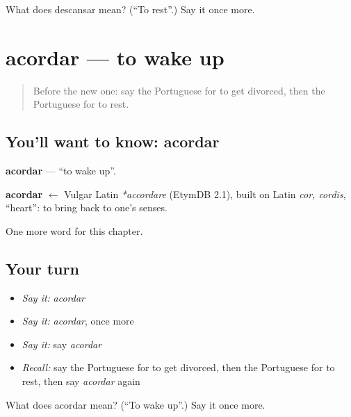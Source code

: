 \begin{tcolorbox}[breakable,colback=teal!4,colframe=teal!35!black,title={Before you move on}]
What does descansar mean? (\textquotedblleft{}To rest\textquotedblright{}.) Say it once more.
\end{tcolorbox}
\section[acordar]{acordar — to wake up}

\label{lesson:PT-C203-acordar}



\begin{quote}
Before the new one: say the Portuguese for to get divorced, then the Portuguese for to rest.
\end{quote}

\subsection*{You'll want to know: acordar}
\textbf{acordar} — \textquotedblleft{}to wake up\textquotedblright{}.

\begin{cousinweb}
\textbf{acordar} $\leftarrow$ Vulgar Latin \emph{*accordare} (EtymDB 2.1), built on Latin \emph{cor, cordis}, \textquotedblleft{}heart\textquotedblright{}: to bring back to one's senses.
\end{cousinweb}

\begin{grammarlens}[title={What you've built}]
One more word for this chapter.
\end{grammarlens}

\subsection*{Your turn}
\begin{itemize}
\raggedright
  \item \emph{Say it:} \emph{acordar}
  \item \emph{Say it:} \emph{acordar}, once more
  \item \emph{Say it:} say \emph{acordar}
  \item \emph{Recall:} say the Portuguese for to get divorced, then the Portuguese for to rest, then say \emph{acordar} again
\end{itemize}

\begin{tcolorbox}[breakable,colback=teal!4,colframe=teal!35!black,title={Before you move on}]
What does acordar mean? (\textquotedblleft{}To wake up\textquotedblright{}.) Say it once more.
\end{tcolorbox}
